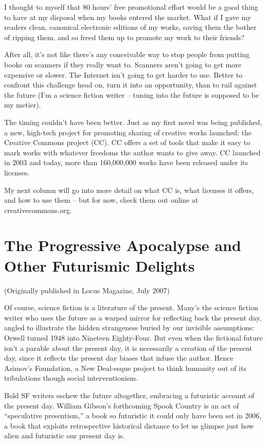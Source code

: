 I thought to myself that 80 hours' free promotional effort would be
a good thing to have at my disposal when my books entered the
market. What if I gave my readers clean, canonical electronic
editions of my works, saving them the bother of ripping them, and
so freed them up to promote my work to their friends?

After all, it's not like there's any conceivable way to stop people
from putting books on scanners if they really want to. Scanners
aren't going to get more expensive or slower. The Internet isn't
going to get harder to use. Better to confront this challenge head
on, turn it into an opportunity, than to rail against the future
(I'm a science fiction writer -- tuning into the future is supposed
to be my metier).

The timing couldn't have been better. Just as my first novel was
being published, a new, high-tech project for promoting sharing of
creative works launched: the Creative Commons project (CC). CC
offers a set of tools that make it easy to mark works with whatever
freedoms the author wants to give away. CC launched in 2003 and
today, more than 160,000,000 works have been released under its
licenses.

My next column will go into more detail on what CC is, what
licenses it offers, and how to use them -- but for now, check them
out online at creativecommons.org.

\section{The Progressive Apocalypse and Other Futurismic Delights}

(Originally published in Locus Magazine, July 2007)

Of course, science fiction is a literature of the present. Many's
the science fiction writer who uses the future as a warped mirror
for reflecting back the present day, angled to illustrate the
hidden strangeness buried by our invisible assumptions: Orwell
turned 1948 into Nineteen Eighty-Four. But even when the fictional
future isn't a parable about the present day, it is necessarily a
creation of the present day, since it reflects the present day
biases that infuse the author. Hence Asimov's Foundation, a New
Deal-esque project to think humanity out of its tribulations though
social interventionism.

Bold SF writers eschew the future altogether, embracing a
futuristic account of the present day. William Gibson's forthcoming
Spook Country is an act of ``speculative presentism,'' a book so
futuristic it could only have been set in 2006, a book that
exploits retrospective historical distance to let us glimpse just
how alien and futuristic our present day is.

